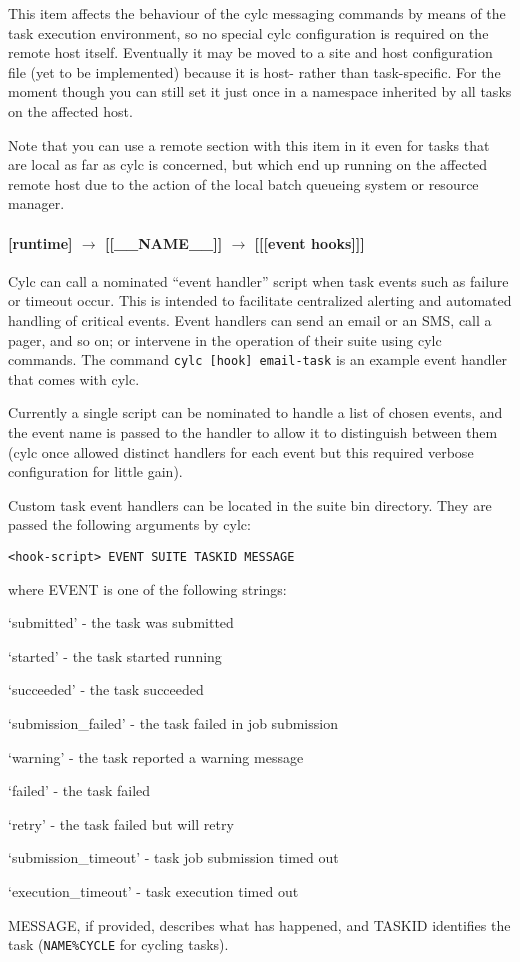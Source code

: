 This item affects the behaviour of the cylc messaging commands by means
of the task execution environment, so no special cylc configuration is
required on the remote host itself. Eventually it may be moved to a site
and host configuration file (yet to be implemented) because it is host-
rather than task-specific. For the moment though you can still set it
just once in a namespace inherited by all tasks on the affected host.

Note that you can use a remote section with this item in it even for
tasks that are local as far as cylc is concerned, but which end up
running on the affected remote host due to the action of the local batch
queueing system or resource manager.

\paragraph[{[[[}event hooks{]]]}]{[runtime] $\rightarrow$ [[\_\_NAME\_\_]] $\rightarrow$ [[[event hooks]]]}
\label{TaskEventHandling}

Cylc can call a nominated ``event handler'' script when task events
such as failure or timeout occur. This is intended to facilitate
centralized alerting and automated handling of critical events. Event
handlers can send an email or an SMS, call a pager, and so on; or
intervene in the operation of their suite using cylc commands. The
command \lstinline=cylc [hook] email-task= is an example event handler
that comes with cylc.

Currently a single script can be nominated to handle a list of chosen
events, and the event name is passed to the handler to allow it to
distinguish between them (cylc once allowed distinct handlers for each
event but this required verbose configuration for little gain).

Custom task event handlers can be located in the suite bin directory.
They are passed the following arguments by cylc:

\begin{lstlisting}
<hook-script> EVENT SUITE TASKID MESSAGE
\end{lstlisting}
where EVENT is one of the following strings:
\begin{myitemize}
    \item `submitted' - the task was submitted
    \item `started' - the task started running 
    \item `succeeded' - the task succeeded
    \item `submission\_failed' - the task failed in job submission
    \item `warning' - the task reported a warning message
    \item `failed' - the task failed
    \item `retry' - the task failed but will retry
    \item `submission\_timeout' - task job submission timed out
    \item `execution\_timeout' - task execution timed out
\end{myitemize}
MESSAGE, if provided, describes what has happened, and TASKID identifies
the task (\lstinline=NAME%CYCLE= for cycling tasks).

